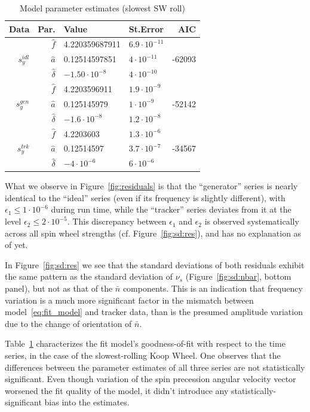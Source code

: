 \documentclass[a4paper]{jacow}
\newcommand{\nbar}{\bar n}
\begin{document}
\begin{table}[h]
  \caption{Model parameter estimates (slowest SW roll)\label{tbl:param_estimates}}
  \begin{tabular}{r|rllr}
    \toprule
    Data & Par. & Value & St.Error & AIC \\
    \midrule
    \multirow{3}{*}{$s_y^{idl}$}
    & $\hat f$ & 4.220359687911 & $6.9\cdot 10^{-11}$ & \multirow{3}{*}{-62093} \\
    & $\hat a$ & 0.12514597851 & $4\cdot 10^{-11}$ & \\
    & $\hat\delta$ & $-1.50\cdot 10^{-8}$ & $4\cdot 10^{-10}$ &\\
    \hline
    \multirow{3}{*}{$s_y^{gen}$}
    & $\hat f$ & 4.2203596911 & $1.9\cdot 10^{-9}$ & \multirow{3}{*}{-52142} \\
    & $\hat a$ & 0.125145979 & $1\cdot 10^{-9}$ & \\
    & $\hat\delta$ & $-1.6\cdot 10^{-8}$ & $1.2\cdot 10^{-8}$ &\\
    \hline
    \multirow{3}{*}{$s_y^{trk}$}
    & $\hat f$ & 4.2203603 & $1.3\cdot 10^{-6}$ & \multirow{3}{*}{-34567} \\
    & $\hat a$ & 0.12514597 & $3.7\cdot 10^{-7}$ & \\
    & $\hat\delta$ & $-4\cdot 10^{-6}$ & $6\cdot 10^{-6}$ &\\
    \bottomrule
  \end{tabular}
\end{table}

What we observe in Figure~\ref{fig:residuals} is that the ``generator'' series is nearly identical
to the ``ideal'' series (even if its frequency is slightly different), with $\epsilon_1 \le 1\cdot10^{-6}$
during run time,
while the ``tracker'' series deviates from it at the level
$\epsilon_2 \le 2\cdot 10^{-5}$. This discrepancy between $\epsilon_1$ and $\epsilon_2$ is observed
systematically across all spin wheel strengths (cf. Figure~\ref{fig:sd:res}), and has no explanation as of yet.

In Figure~\ref{fig:sd:res} we see that the standard deviations of both residuals exhibit the same pattern as
the standard deviation of $\nu_s$ (Figure~\ref{fig:sd:nbar}, bottom panel), but not as that of
the $\nbar$ components. This is an indication that frequency variation is a much more significant factor
in the mismatch between model~\eqref{eq:fit_model} and tracker data, than is the presumed amplitude variation
due to the change of orientation of $\nbar$.

Table~\ref{tbl:param_estimates} characterizes the fit model's goodness-of-fit with respect to the time series,
in the case of the slowest-rolling Koop Wheel.
One observes that the differences between the parameter estimates of all three series are not
statistically significant. Even though variation of the spin precession angular velocity vector worsened
the fit quality of the model, it didn't introduce any statistically-significant bias
into the estimates.
\end{document}
